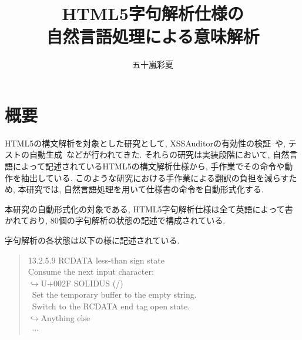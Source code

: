 \documentclass[10pt,twocolumn,uplatex,a4j]{jsreport}
\title{HTML5字句解析仕様の\\自然言語処理による意味解析}
\author{五十嵐彩夏}
\begin{document}
\twocolumn[
\maketitle
]
\section{概要}
HTML5の構文解析を対象とした研究として, 
XSSAuditorの有効性の検証~\cite{XSSAuditor,トランスデューサの包含関係}や, テストの自動生成~\cite{HTML5Testing}などが行われてきた. 
それらの研究は実装段階において, 自然言語によって記述されているHTML5の構文解析仕様から, 手作業でその命令や動作を抽出している. 
このような研究における手作業による翻訳の負担を減らすため, 
本研究では, 自然言語処理を用いて仕様書の命令を自動形式化する. 

本研究の自動形式化の対象である, HTML5字句解析仕様は全て英語によって書かれており, 80個の字句解析の状態の記述で構成されている. 

字句解析の各状態は以下の様に記述されている. 
\begin{quote}
13.2.5.9 RCDATA less-than sign state\\
Consume the next input character:\\
$\hookrightarrow$U+002F SOLIDUS (/)\\
\ Set the temporary buffer to the empty string.\\
\ Switch to the RCDATA end tag open state.\\
$\hookrightarrow $Anything else\\
\ $\cdots\ $
\end{quote}

\end{document}
